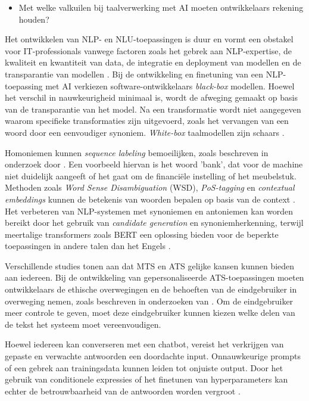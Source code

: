 \begin{itemize}
	\item Met welke valkuilen bij taalverwerking met AI moeten ontwikkelaars rekening houden?
\end{itemize}

Het ontwikkelen van NLP- en NLU-toepassingen is duur en vormt een obstakel voor IT-professionals vanwege factoren zoals het gebrek aan NLP-expertise, de kwaliteit en kwantiteit van data, de integratie en deployment van modellen en de transparantie van modellen \autocite{IBM2022}. Bij de ontwikkeling en finetuning van een NLP-toepassing met AI verkiezen software-ontwikkelaars \textit{black-box} modellen. Hoewel het verschil in nauwkeurigheid minimaal is, wordt de afweging gemaakt op basis van de transparantie van het model. Na een transformatie wordt niet aangegeven waarom specifieke transformaties zijn uitgevoerd, zoals het vervangen van een woord door een eenvoudiger synoniem. \textit{White-box} taalmodellen zijn schaars \autocite{Punardeep2020}.

\medspace 

Homoniemen kunnen \textit{sequence labeling} bemoeilijken, zoals beschreven in onderzoek door \textcite{Roldos2020}. Een voorbeeld hiervan is het woord 'bank', dat voor de machine niet duidelijk aangeeft of het gaat om de financiële instelling of het meubelstuk. Methoden zoals \textit{Word Sense Disambiguation} (WSD), \textit{PoS-tagging} en \textit{contextual embeddings} kunnen de betekenis van woorden bepalen op basis van de context \autocite{Eisenstein2019, Liu2020}. Het verbeteren van NLP-systemen met synoniemen en antoniemen kan worden bereikt door het gebruik van \textit{candidate generation} en synoniemherkenning, terwijl meertalige transformers zoals BERT een oplossing bieden voor de beperkte toepassingen in andere talen dan het Engels \autocite{Dandekar2016, Roldos2020}.

\medspace

Verschillende studies tonen aan dat MTS en ATS gelijke kansen kunnen bieden aan iedereen. Bij de ontwikkeling van gepersonaliseerde ATS-toepassingen moeten ontwikkelaars de ethische overwegingen en de behoeften van de eindgebruiker in overweging nemen, zoals beschreven in onderzoeken van \textcite{Niemeijer2010, Xu2015, Gooding2022}. Om de eindgebruiker meer controle te geven, moet deze eindgebruiker kunnen kiezen welke delen van de tekst het systeem moet vereenvoudigen.

\medspace

Hoewel iedereen kan converseren met een chatbot, vereist het verkrijgen van gepaste en verwachte antwoorden een doordachte input. Onnauwkeurige prompts of een gebrek aan trainingsdata kunnen leiden tot onjuiste output. Door het gebruik van conditionele expressies of het finetunen van hyperparameters kan echter de betrouwbaarheid van de antwoorden worden vergroot \autocite{Miszczak2023, Jiang2023}.

